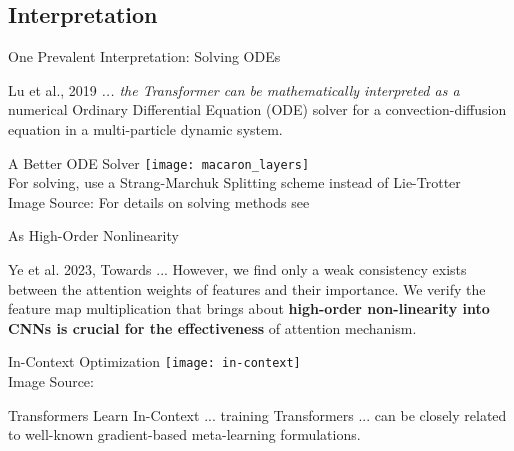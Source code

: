 \subsection{Interpretation}
\begin{frame}[c]{One Prevalent Interpretation: Solving ODEs}
    \large
    \begin{aquote}{Lu et al., 2019 \cite{lu_understanding_2019}}
        {\em ... the Transformer can be mathematically interpreted as
        a} numerical Ordinary Differential Equation (ODE) solver for a
        convection-diffusion equation in a multi-particle dynamic
        system.
    \end{aquote}
\end{frame}


\begin{frame}[c]{A Better ODE Solver}
    \texttt{[image: macaron\_layers]} \\
    \large
    For solving, use a Strang-Marchuk Splitting scheme instead of Lie-Trotter \\
    \normalsize
    \textcolor[gray]{0.6}{
        Image Source: \cite{lu_understanding_2019}
    }
    For details on solving methods see \cite{geiser_decomposition_2009}
\end{frame}


\begin{frame}[c]{As High-Order Nonlinearity}
    \large
    \begin{aquote}{Ye et al. 2023, Towards ... \cite{ye_understanding_2023}}
        However, we find only a weak consistency exists between the attention
        weights of features and their importance. We verify the feature map
        multiplication that brings about \textbf{high-order non-linearity into CNNs is
        crucial for the effectiveness} of attention mechanism.
    \end{aquote}
\end{frame}


\begin{frame}[c]{In-Context Optimization}
    \texttt{[image: in-context]} \\
    \textcolor[gray]{0.6}{
        Image Source: \cite{vonoswald_transformers_2022} 
    }
        \begin{aquote}{Transformers Learn In-Context \cite{vonoswald_transformers_2022}}
            ... training Transformers ... can be closely related to well-known
            gradient-based meta-learning formulations.
        \end{aquote}
\end{frame}

